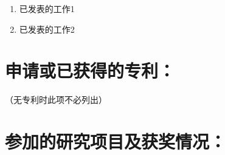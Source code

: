 {
    \setlist[enumerate]{}
    \begin{enumerate}
        \item 已发表的工作1
        \item 已发表的工作2
    \end{enumerate}
}

\section*{申请或已获得的专利：}

（无专利时此项不必列出）

\section*{参加的研究项目及获奖情况：}

\lipsum[1]

\cleardoublepage[plain]%
